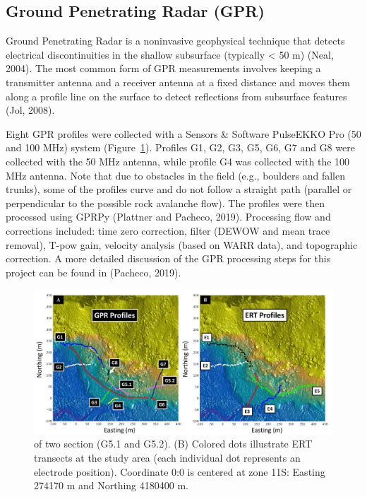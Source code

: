\documentclass[5p]{elsarticle}
\begin{document}
	\subsection{Ground Penetrating Radar (GPR)}
										
Ground Penetrating Radar is a noninvasive geophysical technique that detects electrical discontinuities in the shallow subsurface (typically < 50 m) (Neal, 2004). The most common form of GPR measurements involves keeping a transmitter antenna and a receiver antenna at a fixed distance and moves them along a profile line on the surface to detect reflections from subsurface features (Jol, 2008). 

Eight GPR profiles were collected with a Sensors \& Software PulseEKKO Pro (50 and 100 MHz) system (Figure~\ref{GPR profile 7}). Profiles G1, G2, G3, G5, G6, G7 and G8 were collected with the 50 MHz antenna, while profile G4 was collected with the 100 MHz antenna. Note that due to obstacles in the field (e.g., boulders and fallen trunks), some of the profiles curve and do not follow a straight path (parallel or perpendicular to the possible rock avalanche flow). The profiles were then processed using GPRPy (Plattner and Pacheco, 2019). Processing flow and corrections included: time zero correction, filter (DEWOW and mean trace removal), T-pow gain, velocity analysis (based on WARR data), and topographic correction. A more detailed discussion of the GPR processing steps for this project can be found in (Pacheco, 2019).

											\begin{figure}[h]

	\includegraphics[width=\textwidth]{Figures/GPR_ERT_Map.pdf}
		\caption{of two section (G5.1 and G5.2). (B) Colored dots illustrate ERT transects at the study area (each individual dot represents an electrode position). Coordinate 0:0 is centered at zone 11S: Easting 274170 m and Northing 4180400 m.  \label{GPR profile 7}}

											\end{figure}										
											
\end{document}
